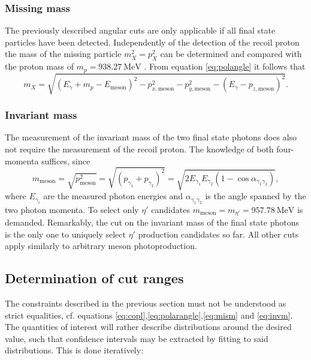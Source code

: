 \subsubsection{Missing mass}
The previously described angular cuts are only applicable if all final state particles have been detected. Independently of the detection of the recoil proton the mass of the missing particle $m_X^2=p_X^2$ can be determined and compared with the proton mass of $m_p=\SI{938.27}{\mega\eV}$ \cite{pdg}. From equation \eqref{eq:polangle} it follows that \begin{equation}
	m_X=\sqrt{(E_\gamma+m_p-E_\text{meson})^2-p_{x,\text{meson}}^2-p_{y,\text{meson}}^2-(E_\gamma-p_{z,\text{meson}})^2}.
	\label{eq:mism}
\end{equation}
\subsubsection{Invariant mass}
The measurement of the invariant mass of the two final state photons does also not require the measurement of the recoil proton. The knowledge of both four-momenta suffices, since \begin{equation}
	m_\text{meson}=\sqrt{p_\text{meson}^2}=\sqrt{(p_{\gamma_1}+p_{\gamma_2})^2}=\sqrt{2E_{\gamma_1}E_{\gamma_2}(1-\cos\alpha_{\gamma_1\gamma_2})},
\label{eq:invm}
\end{equation}
where $E_{\gamma_i}$ are the measured photon energies and $\alpha_{\gamma_1\gamma_2}$ is the angle spanned by the two photon momenta. To select only $\eta'$ candidates $m_\text{meson}=m_{\eta'}=\SI{957.78}{\mega\eV}$ is demanded. Remarkably, the cut on the invariant mass of the final state photons is the only one to uniquely select $\eta'$ production candidates so far. All other cuts apply similarly to arbitrary meson photoproduction.
\subsection{Determination of cut ranges}
The constraints described in the previous section must not be understood as strict equalities, cf. equations \eqref{eq:copl},\eqref{eq:polarangle},\eqref{eq:mism} and \eqref{eq:invm}. The quantities of interest will rather describe distributions around the desired value, such that confidence intervals may be extracted by fitting to said distributions. This is done iteratively:

